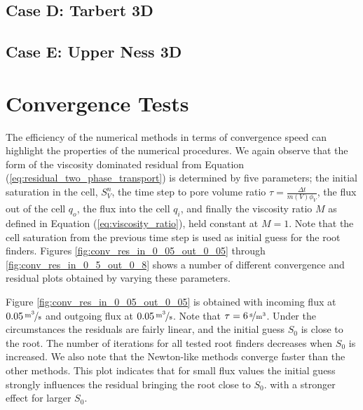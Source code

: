 
\clearpage
\subsection{Case D: Tarbert 3D}
\label{section:caseD}


\clearpage
\subsection{Case E: Upper Ness 3D}
\label{section:caseE}


\clearpage
\section{Convergence Tests}
\label{section:numerical_results_convergence_tests}
The efficiency of the numerical methods in terms of convergence speed can highlight the properties of the numerical procedures. We again  observe that the form of the viscosity dominated residual from Equation (\ref{eq:residual_two_phase_transport}) is determined by five parameters; the initial saturation in the cell, $S_V^{n}$, the time step to pore volume ratio $\tau = \frac{\Delta t}{m(V)\phi_V}$, the flux out of the cell $q_o$, the flux into the cell $q_i$, and finally the viscosity ratio $M$ as defined in Equation (\ref{eq:viscosity_ratio}), held constant at $M = 1$. Note that the cell saturation from the previous time step is used as initial guess for the root finders. Figures \ref{fig:conv_res_in_0_05_out_0_05} through \ref{fig:conv_res_in_0_5_out_0_8} shows a number of different convergence and residual plots obtained by varying these parameters. 

Figure \ref{fig:conv_res_in_0_05_out_0_05} is obtained with incoming flux at $\unitfrac[0.05]{m^3}{s}$ and outgoing flux at $\unitfrac[0.05]{m^3}{s}$. Note that $\tau = \unitfrac[6]{s}{m^3}$. Under the circumstances the residuals are fairly linear, and the initial guess $S_0$ is close to the root. The number of iterations for all tested root finders decreases when $S_0$ is increased. We also note that the Newton-like methods converge faster than the other methods. This plot indicates that for small flux values the initial guess strongly influences the residual bringing the root close to $S_0$. with a stronger effect for larger $S_0$. 

